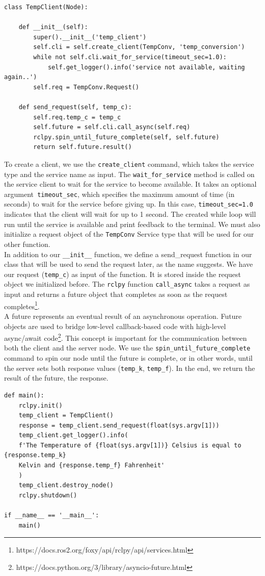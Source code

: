 \documentclass{article}
\begin{document}
\begin{verbatim}
class TempClient(Node):

    def __init__(self):
        super().__init__('temp_client')
        self.cli = self.create_client(TempConv, 'temp_conversion')
        while not self.cli.wait_for_service(timeout_sec=1.0):
            self.get_logger().info('service not available, waiting again..')
        self.req = TempConv.Request()

    def send_request(self, temp_c):
        self.req.temp_c = temp_c
        self.future = self.cli.call_async(self.req)
        rclpy.spin_until_future_complete(self, self.future)
        return self.future.result()
\end{verbatim}
To create a client, we use the \texttt{create\_client} command, which takes the service type and the service name as input. The \texttt{wait\_for\_service} method is called on the service client to wait for the service to become available. It takes an optional argument\texttt{ timeout\_sec}, which specifies the maximum amount of time (in seconds) to wait for the service before giving up. In this case, \texttt{timeout\_sec=1.0} indicates that the client will wait for up to 1 second. The created while loop will run until the service is available and print feedback to the terminal. We must also initialize a request object of the \texttt{TempConv} Service type that will be used for our other function.\\

\noindent
In addition to our \texttt{\_\_init\_\_} function, we define a send\_request function in our class that will be used to send the request later, as the name suggests. We have our request (\texttt{temp\_c}) as input of the function. It is stored inside the request object we initialized before. The \texttt{rclpy} function \texttt{call\_async} takes a request as input and returns a future object that completes as soon as the request completes\footnote{https://docs.ros2.org/foxy/api/rclpy/api/services.html}.\\
\noindent
A future represents an eventual result of an asynchronous operation. Future objects are used to bridge low-level callback-based code with high-level async/await code\footnote{https://docs.python.org/3/library/asyncio-future.html}. This concept is important for the communication between both the client and the server node. We use the \texttt{spin\_until\_future\_complete} command to spin our node until the future is complete, or in other words, until the server sets both response values (\texttt{temp\_k}, \texttt{temp\_f}). In the end, we return the result of the future, the response.
\begin{verbatim}
def main():
    rclpy.init()
    temp_client = TempClient()
    response = temp_client.send_request(float(sys.argv[1]))
    temp_client.get_logger().info(
    f'The Temperature of {float(sys.argv[1])} Celsius is equal to {response.temp_k} 
    Kelvin and {response.temp_f} Fahrenheit'
    )
    temp_client.destroy_node()
    rclpy.shutdown()

if __name__ == '__main__':
    main()
\end{verbatim}
\end{document}
